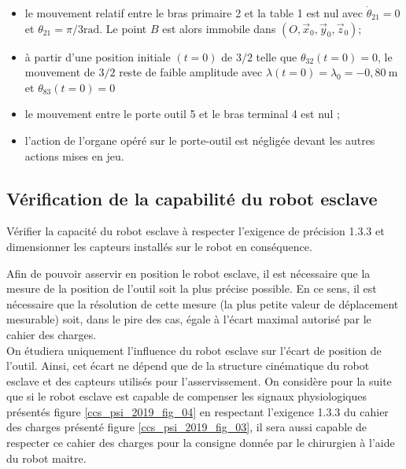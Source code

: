\begin{itemize}
  \item le mouvement relatif entre le bras primaire 2 et la table 1 est nul avec $\dot{\theta}_{21}=0$ et $\theta_{21}=\pi / 3 \mathrm{rad}$. Le point $B$ est alors immobile dans $\left(O, \vec{x}_{0}, \vec{y}_{0}, \vec{z}_{0}\right)$;
  \item à partir d'une position initiale $(t=0)$ de $3 / 2$ telle que $\theta_{32}(t=0)=0$, le mouvement de $3 / 2$ reste de faible amplitude avec $\lambda(t=0)=\lambda_{0}=-0,80 \mathrm{~m}$ et $\theta_{83}(t=0)=0$
  \item le mouvement entre le porte outil 5 et le bras terminal 4 est nul ;
  \item l'action de l'organe opéré sur le porte-outil est négligée devant les autres actions mises en jeu.
\end{itemize}

\subsection{Vérification de la capabilité du robot esclave}
\begin{obj}
Vérifier la capacité du robot esclave à respecter l'exigence de précision 1.3.3 et dimensionner les capteurs installés sur le robot en conséquence.
\end{obj}

Afin de pouvoir asservir en position le robot esclave, il est nécessaire que la mesure de la position de l'outil soit la plus précise possible. En ce sens, il est nécessaire que la résolution de cette mesure (la plus petite valeur de déplacement mesurable) soit, dans le pire des cas, égale à l'écart maximal autorisé par le cahier des charges.\\
On étudiera uniquement l'influence du robot esclave sur l'écart de position de l'outil. Ainsi, cet écart ne dépend que de la structure cinématique du robot esclave et des capteurs utilisés pour l'asservissement. On considère pour la suite que si le robot esclave est capable de compenser les signaux physiologiques présentés figure \ref{ccs_psi_2019_fig_04} en respectant l'exigence 1.3.3 du cahier des charges présenté figure \ref{ccs_psi_2019_fig_03}, il sera aussi capable de respecter ce cahier des charges pour la consigne donnée par le chirurgien à l'aide du robot maitre.\\

